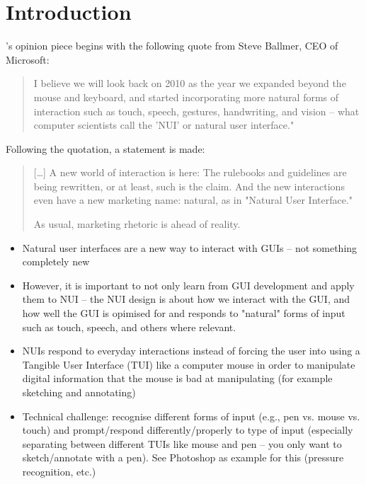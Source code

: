 \section{Introduction}

\citeauthor{norman:natural-user-interfaces-are-not-natural:2010}'s \citeyear{norman:natural-user-interfaces-are-not-natural:2010} opinion piece  begins with the following quote from Steve Ballmer, CEO of Microsoft:

\begin{quote}
I believe we will look back on 2010 as the year we expanded beyond the mouse and keyboard, and started incorporating more natural forms of interaction such as touch, speech, gestures, handwriting, and vision -- what computer scientists call the 'NUI' or natural user interface."
\end{quote}


Following the quotation, a statement is made:

\begin{quotation}
[\dots] A new world of interaction is here: The rulebooks and guidelines are being rewritten, or at least, such is the claim. And the new interactions even have a new marketing name: natural, as in "Natural User Interface."

As usual, marketing rhetoric is ahead of reality.    
\end{quotation}

\begin{itemize}
  \item Natural user interfaces are a new way to interact with GUIs -- not something completely new
  \item However, it is important to not only learn from GUI development and apply them to NUI -- the NUI design is about how we interact with the GUI, and how well the GUI is opimised for and responds to "natural" forms of input such as touch, speech, and others where relevant.
  \item NUIs respond to everyday interactions instead of forcing the user into using a Tangible User Interface (TUI) like a computer mouse in order to manipulate digital information that the mouse is bad at manipulating (for example sketching and annotating)
  \item Technical challenge: recognise different forms of input (e.g., pen vs. mouse vs. touch) and prompt/respond differently/properly to type of input (especially separating between different TUIs like mouse and pen -- you only want to sketch/annotate with a pen). See Photoshop as example for this (pressure recognition, etc.)
\end{itemize}

